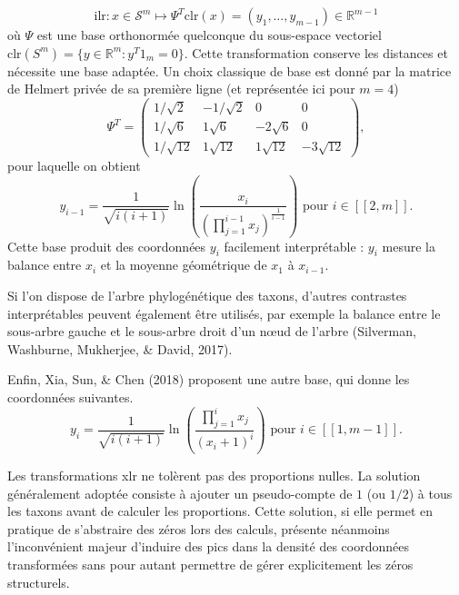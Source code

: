 \documentclass[12pt,a4paper]{reedthesis}
\newcommand \RR {\mathbb{R}}
\theoremstyle{definition}
\theoremstyle{definition}
\theoremstyle{definition}
\theoremstyle{remark}
\begin{document}
\begin{equation*}
\text{ilr}: x \in \mathcal{S}^m \mapsto \Psi^T \text{clr}(x) = \left(y_1, \ldots, y_{m-1}\right) \in \RR^{m-1} 
\end{equation*}
où \(\Psi\) est une base orthonormée quelconque du sous-espace vectoriel \(\text{clr}(S^m) = \{y \in \RR^m: y^T 1_m = 0\}\). Cette transformation conserve les distances et nécessite une base adaptée. Un choix classique de base est donné par la matrice de Helmert privée de sa première ligne (et représentée ici pour \(m = 4\))
\begin{equation*}
\Psi^T = 
\begin{pmatrix}
1/\sqrt{2} & -1/\sqrt{2} & 0 & 0 \\
1/\sqrt{6} & 1\sqrt{6}  & -2\sqrt{6} & 0 \\
1/\sqrt{12} & 1\sqrt{12}  & 1\sqrt{12} & -3\sqrt{12} 
\end{pmatrix},
\end{equation*}
pour laquelle on obtient
\begin{equation*}
y_{i-1} = \frac{1}{\sqrt{i(i+1)}} \ln\left(\frac{x_i}{\left(\prod_{j=1}^{i-1} x_j\right)^{\frac{1}{i-1}}}\right) \text{ pour } i \in [\![2,m]\!].
\end{equation*}
Cette base produit des coordonnées \(y_i\) facilement interprétable : \(y_i\) mesure la balance entre \(x_i\) et la moyenne géométrique de \(x_1\) à \(x_{i-1}\).

Si l'on dispose de l'arbre phylogénétique des taxons, d'autres contrastes interprétables peuvent également être utilisés, par exemple la balance entre le sous-arbre gauche et le sous-arbre droit d'un nœud de l'arbre (Silverman, Washburne, Mukherjee, \& David, 2017).

Enfin, Xia, Sun, \& Chen (2018) proposent une autre base, qui donne les coordonnées suivantes.
\begin{equation*}
y_i = \frac{1}{\sqrt{i(i+1)}}\ln \left(\frac{\prod_{j=1}^i x_j}{(x_i + 1)^i}\right) \text{ pour } i \in [\![1,m-1]\!].
\end{equation*}
\newline

Les transformations xlr ne tolèrent pas des proportions nulles. La solution généralement adoptée consiste à ajouter un pseudo-compte de \(1\) (ou \(1/2\)) à tous les taxons avant de calculer les proportions. Cette solution, si elle permet en pratique de s'abstraire des zéros lors des calculs, présente néanmoins l'inconvénient majeur d'induire des pics dans la densité des coordonnées transformées sans pour autant permettre de gérer explicitement les zéros structurels.
\end{document}
